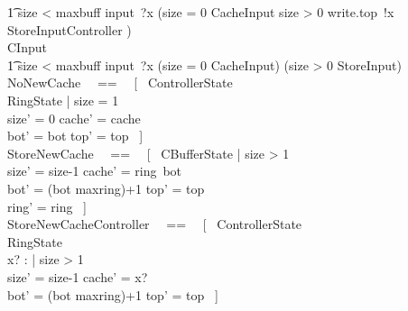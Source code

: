 \begin{circus}

        \t1 \lcircguard size < maxbuff \rcircguard \circguard input~?x \then
            (\lcircguard size = 0 \rcircguard \circguard CacheInput
            \extchoice
             \lcircguard size > 0 \rcircguard \circguard write.top~!x \then StoreInputController
            ) \\
    CInput \circdef \\
        \t1 \lcircguard size < maxbuff \rcircguard \circguard input~?x \then
            (\lcircguard size = 0 \rcircguard \circguard CacheInput)
            \extchoice
            (\lcircguard size > 0 \rcircguard \circguard StoreInput) \\
    NoNewCache ~~==~~ [~ \Delta ControllerState
            \\%
            \Xi RingState
        |
            size = 1
            \\%
            size' = 0 \land cache' = cache
            \\%
            bot' = bot \land top' = top ~] \\
    StoreNewCache ~~==~~ [~ \Delta CBufferState
        |
            size > 1
            \\
            size' = size-1 \land cache' = ring~bot
            \\
            bot' = (bot \mod maxring)+1 \land top' = top
            \\
            ring' = ring ~] \\
    StoreNewCacheController ~~==~~ [~     \Delta ControllerState
            \\%
            \Xi RingState
            \\%
            x? : \nat
        |
            size > 1
            \\%
            size' = size-1 \land cache' = x?
            \\%
            bot' = (bot \mod maxring)+1 \land top' = top ~] \\

\end{circus}
